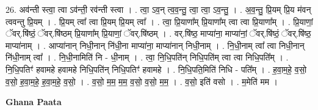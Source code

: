 \documentclass[17pt]{extarticle}
\begin{document}
26. अव॑न्ती स्त्वा॒ त्वा ऽव॑न्ती॒ रव॑न्ती स्त्वा । . त्वा॒ ऽव॒न् त्व॒व॒न्तु॒ त्वा॒ त्वा॒ ऽव॒न्तु॒ । . अ॒व॒न्तु॒ प्रि॒यम् प्रि॒य म॑वन् त्ववन्तु प्रि॒यम् । . प्रि॒यम् त्वा᳚ त्वा प्रि॒यम् प्रि॒यम् त्वा᳚ । . त्वा॒ प्रि॒याणा᳚म् प्रि॒याणा᳚म् त्वा त्वा प्रि॒याणा᳚म् । . प्रि॒याणां॒ ॅवर्.षि॑ष्ठं॒ ॅवर्.षि॑ष्ठम् प्रि॒याणा᳚म् प्रि॒याणां॒ ॅवर्.षि॑ष्ठम् । . वर्.षि॑ष्ठ॒ माप्या॑ना॒ माप्या॑नां॒ ॅवर्.षि॑ष्ठं॒ ॅवर्.षि॑ष्ठ॒ माप्या॑नाम् । . आप्या॑नान् निधी॒नान् नि॑धी॒ना माप्या॑ना॒ माप्या॑नान् निधी॒नाम् । . नि॒धी॒नाम् त्वा᳚ त्वा निधी॒नान् नि॑धी॒नाम् त्वा᳚ । . नि॒धी॒नामिति॑ नि - धी॒नाम् । . त्वा॒ नि॒धि॒पति॑न् निधि॒पति॑म् त्वा त्वा निधि॒पति᳚म् । . नि॒धि॒पतिꣳ॑ हवामहे हवामहे निधि॒पति॑न् निधि॒पतिꣳ॑ हवामहे । . नि॒धि॒पति॒मिति॑ निधि - पति᳚म् । . ह॒वा॒म॒हे॒ व॒सो॒ व॒सो॒ ह॒वा॒म॒हे॒ ह॒वा॒म॒हे॒ व॒सो॒ । . व॒सो॒ म॒म॒ म॒म॒ व॒सो॒ व॒सो॒ म॒म॒ । . व॒सो॒ इति॑ वसो । . म॒मेति॑ मम । \newline

\textbf{Ghana Paata } \newline
\end{document}
